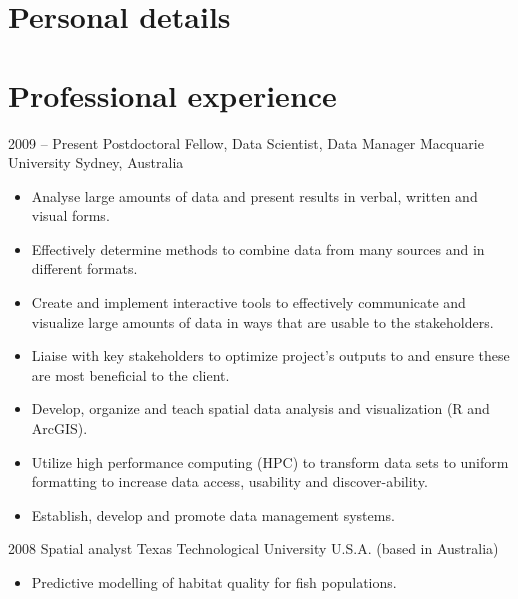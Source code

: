 \documentclass[11pt,a4paper,sans]{moderncv}        %
\begin{document}
\makecvtitle

\section{Personal details}

\section{Professional experience}

\cventry
  {2009 -- Present}
  {Postdoctoral Fellow, Data Scientist, Data Manager}
  {Macquarie University}  
  {Sydney, Australia}
  {}
  {\begin{itemize}
  \item Analyse large amounts of data and present results in verbal, written and visual forms.
  \item Effectively determine methods to combine data from many sources and in different formats.
  \item Create and implement interactive tools to effectively communicate and visualize large amounts of data in ways that are usable to the stakeholders.
  \item Liaise with key stakeholders to optimize project’s outputs to and ensure these are most beneficial to the client.
  \item Develop, organize and teach spatial data analysis and visualization (R and ArcGIS).
  \item Utilize high performance computing (HPC) to transform data sets to uniform formatting to increase data access, usability and discover-ability.
  \item Establish, develop and promote data management systems.
  \end{itemize}
  }

\cventry
  {2008}
  {Spatial analyst}
  {Texas Technological University}
  {U.S.A. (based in Australia)}
  {}
  {\begin{itemize}
  \item Predictive modelling of habitat quality for fish populations.
  \end{itemize}
  }
  
\end{document}
